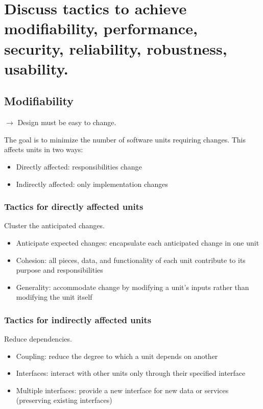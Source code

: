 \clearpage{}
\section{Discuss tactics to achieve modifiability, performance, security,
reliability, robustness, usability.}

\subsection{Modifiability}

$\rightarrow$ Design must be easy to change. \newline

The goal is to minimize the number of software units requiring changes. This affects units in
two ways:

\begin{itemize}
    \item Directly affected: responsibilities change
    \item Indirectly affected: only implementation changes
\end{itemize}

\subsubsection{Tactics for directly affected units}

Cluster the anticipated changes.

\begin{itemize}
    \item Anticipate expected changes: encapsulate each anticipated change in one unit
    \item Cohesion: all pieces, data, and functionality of each unit contribute to its purpose
and responsibilities
    \item Generality: accommodate change by modifying a unit's inputs rather than modifying
the unit itself
\end{itemize}

\subsubsection{Tactics for indirectly affected units}

Reduce dependencies.

\begin{itemize}
    \item Coupling: reduce the degree to which a unit depends on another
    \item Interfaces: interact with other units only through their specified interface
    \item Multiple interfaces: provide a new interface for new data or services (preserving
existing interfaces)
\end{itemize}

